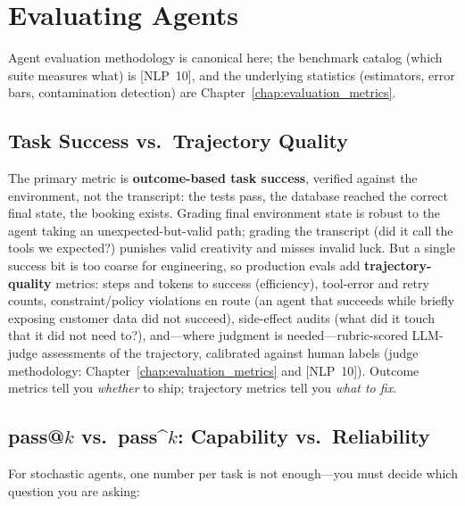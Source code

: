 \section{Evaluating Agents}
\label{sec:agent_eval}

Agent evaluation methodology is canonical here; the benchmark catalog (which suite measures what) is [NLP~10], and the underlying statistics (estimators, error bars, contamination detection) are Chapter~\ref{chap:evaluation_metrics}.

\subsection{Task Success vs.\ Trajectory Quality}

The primary metric is \textbf{outcome-based task success}, verified against the environment, not the transcript: the tests pass, the database reached the correct final state, the booking exists. Grading final environment state is robust to the agent taking an unexpected-but-valid path; grading the transcript (did it call the tools we expected?) punishes valid creativity and misses invalid luck. But a single success bit is too coarse for engineering, so production evals add \textbf{trajectory-quality} metrics: steps and tokens to success (efficiency), tool-error and retry counts, constraint/policy violations en route (an agent that succeeds while briefly exposing customer data did not succeed), side-effect audits (what did it touch that it did not need to?), and---where judgment is needed---rubric-scored LLM-judge assessments of the trajectory, calibrated against human labels (judge methodology: Chapter~\ref{chap:evaluation_metrics} and [NLP~10]). Outcome metrics tell you \textit{whether} to ship; trajectory metrics tell you \textit{what to fix}.

\subsection{pass@$k$ vs.\ pass\textasciicircum{}$k$: Capability vs.\ Reliability}

For stochastic agents, one number per task is not enough---you must decide which question you are asking:

